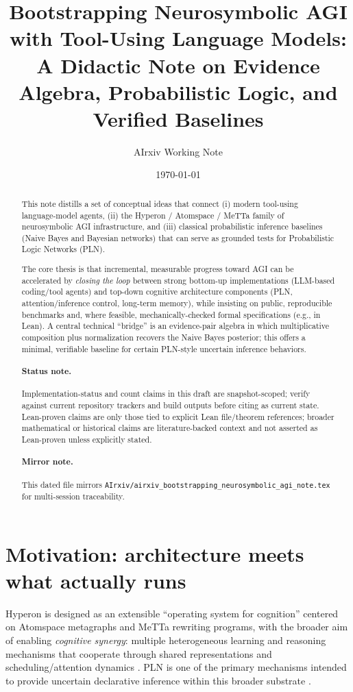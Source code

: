 \documentclass[11pt]{article}
\title{Bootstrapping Neurosymbolic AGI with Tool-Using Language Models:\\
A Didactic Note on Evidence Algebra, Probabilistic Logic, and Verified Baselines}
\author{AIrxiv Working Note}
\date{\today}
\begin{document}
\maketitle

\begin{abstract}
This note distills a set of conceptual ideas that connect (i) modern tool-using language-model agents,
(ii) the Hyperon / Atomspace / MeTTa family of neurosymbolic AGI infrastructure, and (iii) classical
probabilistic inference baselines (Naive Bayes and Bayesian networks) that can serve as grounded tests
for Probabilistic Logic Networks (PLN).

The core thesis is that incremental, measurable progress toward AGI can be accelerated by
\emph{closing the loop} between strong bottom-up implementations (LLM-based coding/tool agents)
and top-down cognitive architecture components (PLN, attention/inference control, long-term memory),
while insisting on public, reproducible benchmarks and, where feasible, mechanically-checked
formal specifications (e.g., in Lean). A central technical ``bridge'' is an evidence-pair algebra in which
multiplicative composition plus normalization recovers the Naive Bayes posterior; this offers a minimal,
verifiable baseline for certain PLN-style uncertain inference behaviors.
\paragraph{Status note.} Implementation-status and count claims in this draft are snapshot-scoped; verify against current repository trackers and build outputs before citing as current state. Lean-proven claims are only those tied to explicit Lean file/theorem references; broader mathematical or historical claims are literature-backed context and not asserted as Lean-proven unless explicitly stated.
\paragraph{Mirror note.} This dated file mirrors \texttt{AIrxiv/airxiv\_bootstrapping\_neurosymbolic\_agi\_note.tex} for multi-session traceability.
\end{abstract}

\section{Motivation: architecture meets what actually runs}

Hyperon is designed as an extensible ``operating system for cognition'' centered on Atomspace
metagraphs and MeTTa rewriting programs, with the broader aim of enabling \emph{cognitive synergy}:
multiple heterogeneous learning and reasoning mechanisms that cooperate through shared
representations and scheduling/attention dynamics \cite{hyperon-overview,hyperon-plan}.
PLN is one of the primary mechanisms intended to provide uncertain declarative inference within
this broader substrate \cite{pln-book,hyperon-overview}.
\end{document}
